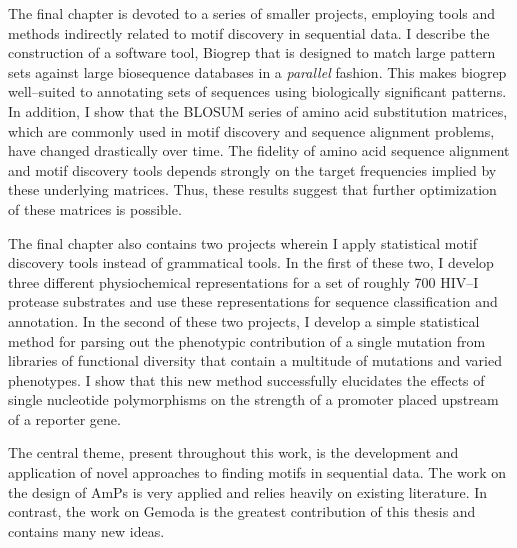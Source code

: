The final chapter is devoted to a series of smaller projects,
employing tools and methods indirectly related to motif discovery in
sequential data.  I describe the construction of a software tool,
Biogrep that is designed to match large pattern sets against large
biosequence databases in a \emph{parallel} fashion. This makes
biogrep well--suited to annotating sets of sequences using
biologically significant patterns.  In addition, I show that the
BLOSUM series of amino acid substitution matrices, which are
commonly used in motif discovery and sequence alignment problems,
have changed drastically over time.  The fidelity of amino acid
sequence alignment and motif discovery tools depends strongly on the
target frequencies implied by these underlying matrices.  Thus,
these results suggest that further optimization of these matrices is
possible.

The final chapter also contains two projects wherein I apply
statistical motif discovery tools instead of grammatical tools. In
the first of these two, I develop three different physiochemical
representations for a set of roughly 700 HIV--I protease substrates
and use these representations for sequence classification and
annotation.  In the second of these two projects, I develop a simple
statistical method for parsing out the phenotypic contribution of a
single mutation from libraries of functional diversity that contain
a multitude of mutations and varied phenotypes.  I show that this
new method successfully elucidates the effects of single nucleotide
polymorphisms on the strength of a promoter placed upstream of a
reporter gene.

The central theme, present throughout this work, is the development
and application of novel approaches to finding motifs in sequential
data.  The work on the design of AmPs is very applied and relies
heavily on existing literature.  In contrast, the work on Gemoda is
the greatest contribution of this thesis and contains many new
ideas.

